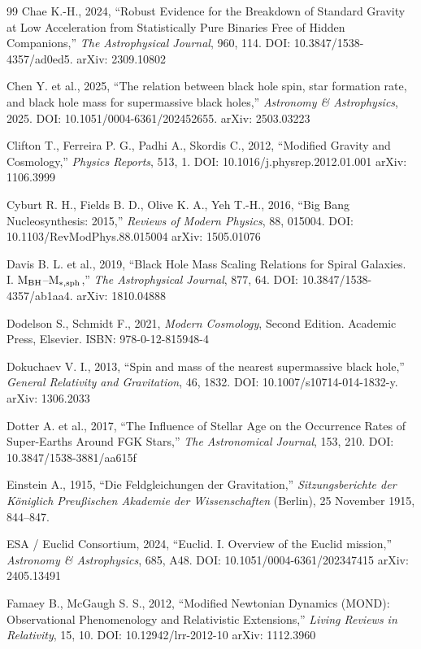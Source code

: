 \documentclass[10pt,a4paper]{article}
\begin{document}
\begin{thebibliography}{99}
Chae K.-H., 2024, ``Robust Evidence for the Breakdown of Standard Gravity at Low Acceleration from Statistically Pure Binaries Free of Hidden Companions,'' \emph{The Astrophysical Journal}, 960, 114. DOI: 10.3847/1538-4357/ad0ed5. arXiv: 2309.10802

Chen Y. et al., 2025, ``The relation between black hole spin, star formation rate, and black hole mass for supermassive black holes,'' \emph{Astronomy \& Astrophysics}, 2025. DOI: 10.1051/0004-6361/202452655. arXiv: 2503.03223

Clifton T., Ferreira P. G., Padhi A., Skordis C., 2012, ``Modified Gravity and Cosmology,'' \emph{Physics Reports}, 513, 1. DOI: 10.1016/j.physrep.2012.01.001 arXiv: 1106.3999

Cyburt R. H., Fields B. D., Olive K. A., Yeh T.-H., 2016, ``Big Bang Nucleosynthesis: 2015,'' \emph{Reviews of Modern Physics}, 88, 015004. DOI: 10.1103/RevModPhys.88.015004 arXiv: 1505.01076

Davis B. L. et al., 2019, ``Black Hole Mass Scaling Relations for Spiral Galaxies. I. M$_{\rm BH}$--M$_{*,{\rm sph}}$,'' \emph{The Astrophysical Journal}, 877, 64. DOI: 10.3847/1538-4357/ab1aa4. arXiv: 1810.04888

Dodelson S., Schmidt F., 2021, \emph{Modern Cosmology}, Second Edition. Academic Press, Elsevier. ISBN: 978-0-12-815948-4

Dokuchaev V. I., 2013, ``Spin and mass of the nearest supermassive black hole,'' \emph{General Relativity and Gravitation}, 46, 1832. DOI: 10.1007/s10714-014-1832-y. arXiv: 1306.2033

Dotter A. et al., 2017, ``The Influence of Stellar Age on the Occurrence Rates of Super-Earths Around FGK Stars,'' \emph{The Astronomical Journal}, 153, 210. DOI: 10.3847/1538-3881/aa615f

Einstein A., 1915, ``Die Feldgleichungen der Gravitation,'' \emph{Sitzungsberichte der Königlich Preußischen Akademie der Wissenschaften} (Berlin), 25 November 1915, 844--847.

ESA / Euclid Consortium, 2024, ``Euclid. I. Overview of the Euclid mission,'' \emph{Astronomy \& Astrophysics}, 685, A48. DOI: 10.1051/0004-6361/202347415 arXiv: 2405.13491

Famaey B., McGaugh S. S., 2012, ``Modified Newtonian Dynamics (MOND): Observational Phenomenology and Relativistic Extensions,'' \emph{Living Reviews in Relativity}, 15, 10. DOI: 10.12942/lrr-2012-10 arXiv: 1112.3960


\end{thebibliography}
\end{document}
